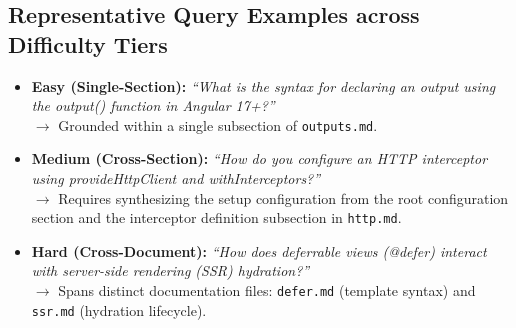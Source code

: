 \subsection{Representative Query Examples across Difficulty Tiers}
\begin{itemize}
    \item \textbf{Easy (Single-Section):} \textit{``What is the syntax for declaring an output using the output() function in Angular 17+?''} \\
    $\rightarrow$ Grounded within a single subsection of \texttt{outputs.md}.
    
    \item \textbf{Medium (Cross-Section):} \textit{``How do you configure an HTTP interceptor using provideHttpClient and withInterceptors?''} \\
    $\rightarrow$ Requires synthesizing the setup configuration from the root configuration section and the interceptor definition subsection in \texttt{http.md}.
    
    \item \textbf{Hard (Cross-Document):} \textit{``How does deferrable views (@defer) interact with server-side rendering (SSR) hydration?''} \\
    $\rightarrow$ Spans distinct documentation files: \texttt{defer.md} (template syntax) and \texttt{ssr.md} (hydration lifecycle).
\end{itemize}
